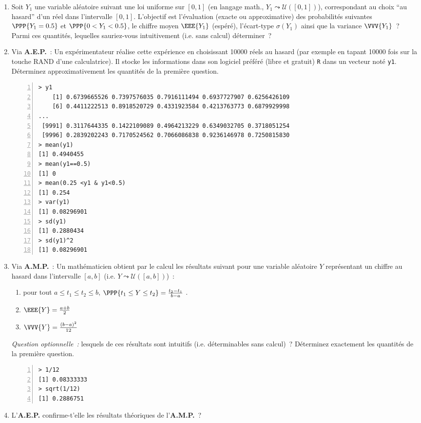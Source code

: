 \documentclass[10pt]{report}
\begin{document}
\begin{exercice}\label{ex:unif}
\begin{enumerate}
\item Soit $Y_1$ une variable aléatoire suivant une loi uniforme sur $[0,1]$ (en langage math., $Y_1\leadsto \mathcal{U}([0,1])$), correspondant au choix ``au hasard'' d'un réel dans l'intervalle $[0,1]$. L'objectif est l'évaluation (exacte ou approximative) des probabilités suivantes $\PPP{Y_1=0.5}$ et $\PPP{0<Y_1<0.5}$, le chiffre moyen $\EEE{Y_1}$ (espéré), l'écart-type $\sigma(Y_1)$ ainsi que la variance $\VVV{Y_1}$~? Parmi ces quantités, lequelles sauriez-vous intuitivement (i.e. sans calcul) déterminer~?

\item Via \textbf{A.E.P.}~: Un expérimentateur réalise cette expérience en choisissant 10000 réels au hasard (par exemple en tapant 10000 fois sur la touche RAND d'une calculatrice). Il stocke les informations dans son logiciel préféré (libre et gratuit) \texttt{R} dans un vecteur noté \texttt{y1}. Déterminez approximativement les quantités de la première question.
\begin{Verbatim}[frame=leftline,fontfamily=tt,fontshape=n,numbers=left]
> y1
    [1] 0.6739665526 0.7397576035 0.7916111494 0.6937727907 0.6256426109
    [6] 0.4411222513 0.8918520729 0.4331923584 0.4213763773 0.6879929998
...
 [9991] 0.3117644335 0.1422109089 0.4964213229 0.6349032705 0.3718051254
 [9996] 0.2839202243 0.7170524562 0.7066086838 0.9236146978 0.7250815830
> mean(y1)
[1] 0.4940455
> mean(y1==0.5)
[1] 0
> mean(0.25 <y1 & y1<0.5)
[1] 0.254
> var(y1)
[1] 0.08296901
> sd(y1)
[1] 0.2880434
> sd(y1)^2
[1] 0.08296901
\end{Verbatim}


\item Via \textbf{A.M.P.}~: Un mathématicien obtient par le calcul les résultats suivant pour une variable aléatoire $Y$ représentant un chiffre au hasard dans l'intervalle $[a,b]$ (i.e. $Y\leadsto\mathcal{U}([a,b])$)~: 
\begin{enumerate}
\item pour tout $a\leq t_1 \leq t_2\leq b$, $\PPP{t_1\leq Y \leq t_2}=\frac{t_2-t_1}{b-a}$ .
\item $\EEE{Y}=\frac{a+b}2$
\item $\VVV{Y}=\frac{(b-a)^2}{12}$
\end{enumerate}
\noindent \textit{Question optionnelle~:} lesquels de ces résultats sont intuitifs (i.e. déterminables sans calcul)~?
Déterminez exactement les quantités de la première question.
\begin{Verbatim}[frame=leftline,fontfamily=tt,fontshape=n,numbers=left]
> 1/12
[1] 0.08333333
> sqrt(1/12)
[1] 0.2886751
\end{Verbatim}


\item L'\textbf{A.E.P.} confirme-t'elle les résultats théoriques de l'\textbf{A.M.P.}~?
\end{enumerate}
\end{exercice}
\end{document}
